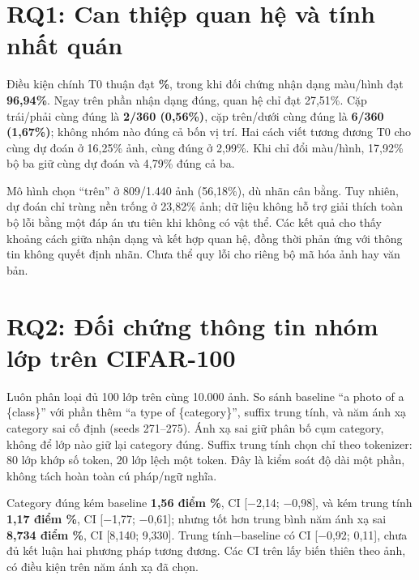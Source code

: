 \documentclass[11pt,a4paper]{article}
\begin{document}
\section{RQ1: Can thiệp quan hệ và tính nhất quán}
\begin{center}
\label{tab:spatial}
\small

\end{center}
\vspace{-5pt}
Điều kiện chính T0 thuận đạt \textbf{\SyntheticAcc\%}, trong khi đối chứng nhận dạng màu/hình đạt \textbf{96,94\%}. Ngay trên phần nhận dạng đúng, quan hệ chỉ đạt 27,51\%. Cặp trái/phải cùng đúng là \textbf{2/360 (0,56\%)}, cặp trên/dưới cùng đúng là \textbf{6/360 (1,67\%)}; không nhóm nào đúng cả bốn vị trí. Hai cách viết tương đương T0 cho cùng dự đoán ở 16,25\% ảnh, cùng đúng ở 2,99\%. Khi chỉ đổi màu/hình, 17,92\% bộ ba giữ cùng dự đoán và 4,79\% đúng cả ba.

Mô hình chọn ``trên'' ở 809/1.440 ảnh (56,18\%), dù nhãn cân bằng. Tuy nhiên, dự đoán chỉ trùng nền trống ở 23,82\% ảnh; dữ liệu không hỗ trợ giải thích toàn bộ lỗi bằng một đáp án ưu tiên khi không có vật thể. Các kết quả cho thấy khoảng cách giữa nhận dạng và kết hợp quan hệ, đồng thời phản ứng với thông tin không quyết định nhãn. Chưa thể quy lỗi cho riêng bộ mã hóa ảnh hay văn bản.

\newpage
\section{RQ2: Đối chứng thông tin nhóm lớp trên CIFAR-100}
Luôn phân loại đủ 100 lớp trên cùng 10.000 ảnh. So sánh baseline ``a photo of a \{class\}'' với phần thêm ``a type of \{category\}'', suffix trung tính, và năm ánh xạ category sai cố định (seeds 271--275). Ánh xạ sai giữ phân bố cụm category, không để lớp nào giữ lại category đúng. Suffix trung tính chọn chỉ theo tokenizer: 80 lớp khớp số token, 20 lớp lệch một token. Đây là kiểm soát độ dài một phần, không tách hoàn toàn cú pháp/ngữ nghĩa.

\begin{center}
\label{tab:category}

\end{center}
\vspace{-4pt}
Category đúng kém baseline \textbf{1,56 điểm \%}, CI [−2,14; −0,98], và kém trung tính \textbf{1,17 điểm \%}, CI [−1,77; −0,61]; nhưng tốt hơn trung bình năm ánh xạ sai \textbf{8,734 điểm \%}, CI [8,140; 9,330]. Trung tính−baseline có CI [−0,92; 0,11], chưa đủ kết luận hai phương pháp tương đương. Các CI trên lấy biến thiên theo ảnh, có điều kiện trên năm ánh xạ đã chọn.
\end{document}
